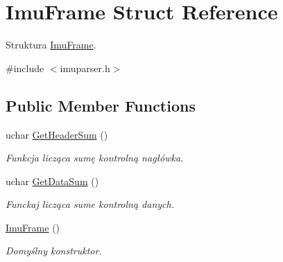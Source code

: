\hypertarget{struct_imu_frame}{}\section{Imu\+Frame Struct Reference}
\label{struct_imu_frame}


Struktura \mbox{\hyperlink{struct_imu_frame}{Imu\+Frame}}.  




{\ttfamily \#include $<$imuparser.\+h$>$}

\subsection*{Public Member Functions}
\begin{DoxyCompactItemize}
\item 
\mbox{\label{struct_imu_frame_addbc32b1569d6433d9ca6a8974231b98}} 
uchar \mbox{\hyperlink{struct_imu_frame_addbc32b1569d6433d9ca6a8974231b98}{Get\+Header\+Sum}} ()
\begin{DoxyCompactList}\small\item\em Funkcja licząca sumę kontrolną nagłówka. \end{DoxyCompactList}\item 
\mbox{\label{struct_imu_frame_acc8f3636213ff45142fbf95ae59daba4}} 
uchar \mbox{\hyperlink{struct_imu_frame_acc8f3636213ff45142fbf95ae59daba4}{Get\+Data\+Sum}} ()
\begin{DoxyCompactList}\small\item\em Funckaj licząca sume kontrolną danych. \end{DoxyCompactList}\item 
\mbox{\label{struct_imu_frame_a9cebaa9b0a3628029afb610ba6b4ba93}} 
\mbox{\hyperlink{struct_imu_frame_a9cebaa9b0a3628029afb610ba6b4ba93}{Imu\+Frame}} ()
\begin{DoxyCompactList}\small\item\em Domyślny konstruktor. \end{DoxyCompactList}\end{DoxyCompactItemize}
